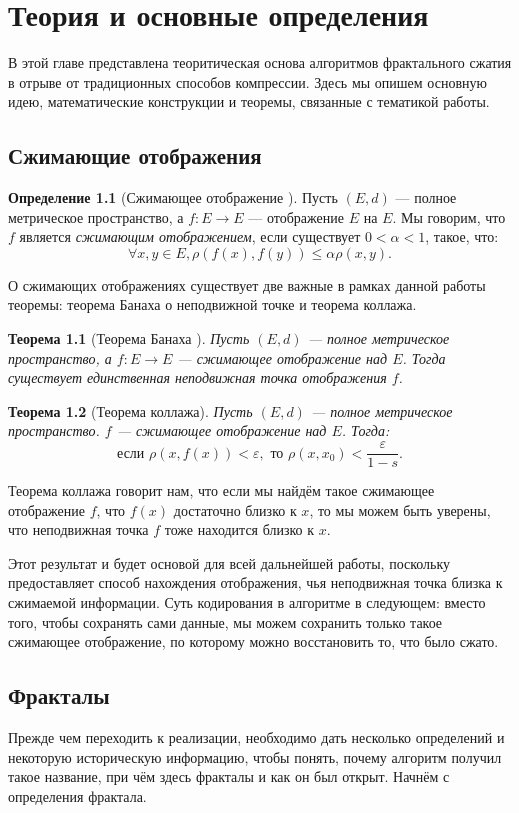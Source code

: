 \documentclass[bachelor,paper]{pmk-graduate}
\newtheorem{thm}{Теорема}
\theoremstyle{definition}
\newtheorem{dfn}{Определение}
\begin{document}
\chapter{Теория и основные определения}
В этой главе представлена теоритическая основа алгоритмов фрактального сжатия в отрыве от традиционных способов компрессии. Здесь мы опишем основную идею, математические конструкции и теоремы, связанные с тематикой работы.

\section{Сжимающие отображения}
\begin{dfn}[Сжимающее отображение \cite{funcAn}]
  Пусть $(E,d)$ --- полное метрическое пространство, а $f:E\rightarrow E$ --- отображение $E$ на $E$. Мы говорим, что $f$ является \emph{сжимающим отображением}, если существует $0 < \alpha < 1$, такое, что:
  $$\forall x,y \in E, \rho(f(x), f(y)) \leqslant \alpha \rho(x,y).$$
\end{dfn}

О сжимающих отображениях существует две важные в рамках данной работы теоремы: теорема Банаха о неподвижной точке и теорема коллажа.
\begin{thm}[Теорема Банаха \cite{funcAn}]
  Пусть $(E,d)$ --- полное метрическое пространство, а $f:E\rightarrow E$ --- сжимающее отображение над $E$. Тогда существует единственная неподвижная точка отображения $f$.
\end{thm}
\begin{thm}[Теорема коллажа]
  Пусть $(E,d)$ --- полное метрическое пространство. $f$ --- сжимающее отображение над $E$. Тогда: $$\text{если } \rho(x,f(x))<\varepsilon, \text{ то } \rho(x,x_0) < \dfrac{\varepsilon}{1-s}.$$
\end{thm}

Теорема коллажа говорит нам, что если мы найдём такое сжимающее отображение $f$, что $f(x)$ достаточно близко к $x$, то мы можем быть уверены, что неподвижная точка $f$ тоже находится близко к $x$.

Этот результат и будет основой для всей дальнейшей работы, поскольку предоставляет способ нахождения отображения, чья неподвижная точка близка к сжимаемой информации. Суть кодирования в алгоритме в следующем: вместо того, чтобы сохранять сами данные, мы можем сохранить только такое сжимающее отображение, по которому можно восстановить то, что было сжато.

\section{Фракталы}
Прежде чем переходить к реализации, необходимо дать несколько определений и некоторую историческую информацию, чтобы понять, почему алгоритм получил такое название, при чём здесь фракталы и как он был открыт. Начнём с определения фрактала.
\end{document}
